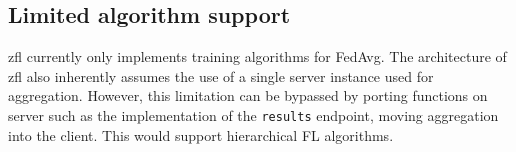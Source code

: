 \documentclass[12pt]{article}
\begin{document}
\subsection{Limited algorithm support}
zfl currently only implements training algorithms for FedAvg. The architecture of zfl also
inherently assumes the use of a single server instance used for aggregation. However, this
limitation can be bypassed by porting functions on server such as the implementation of the
\verb|results| endpoint, moving aggregation into the client. This would support
hierarchical FL algorithms.

\end{document}
